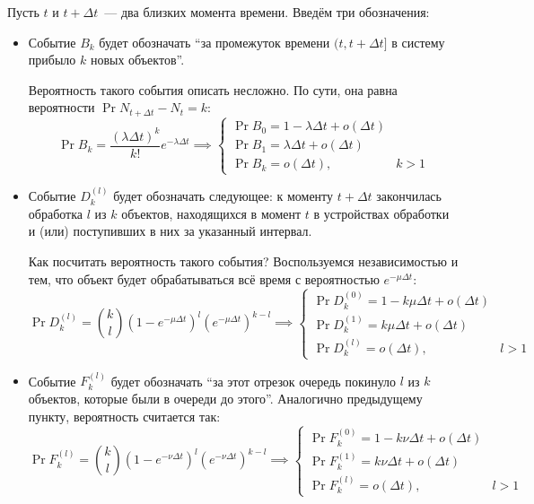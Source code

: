 Пусть \(t\) и \(t + \Delta t\)~--- два близких момента времени. Введём три 
обозначения:
\begin{itemize}
	\item Событие \(B_{k}\) будет обозначать ``за промежуток времени \((t, t + 
	\Delta t]\) в систему прибыло \(k\) новых объектов''. 
	
	Вероятность такого события описать несложно. По сути, она равна вероятности 
	\(\Pr{N_{t + \Delta t} - N_{t} = k}\):
	\[
		\Pr{B_{k}} = \frac{(\lambda\Delta t)^{k}}{k!}e^{-\lambda\Delta t} 
		\implies \begin{cases}
		\Pr{B_{0}} = 1 - \lambda\Delta t + o(\Delta t) \\
		\Pr{B_{1}} = \lambda\Delta t + o(\Delta t) \\
		\Pr{B_{k}} = o(\Delta t), & k > 1
		\end{cases}
	\]
	
	\item Событие \(D_{k}^{(l)}\) будет обозначать следующее: к моменту \(t + 
	\Delta t\) закончилась обработка \(l\) из \(k\) объектов, находящихся в 
	момент \(t\) в устройствах обработки и (или) поступивших в них за указанный 
	интервал.
	
	Как посчитать вероятность такого события? Воспользуемся независимостью и 
	тем, что объект будет обрабатываться всё время с вероятностью 
	\(e^{-\mu\Delta t}\):
	\[
		\Pr{D_{k}^{(l)}} = \binom{k}{l}(1 - e^{-\mu\Delta t})^{l}(e^{-\mu\Delta 
		t})^{k - l} \implies \begin{cases}
		\Pr{D_{k}^{(0)}} = 1 - k\mu\Delta t + o(\Delta t) \\
		\Pr{D_{k}^{(1)}} = k\mu\Delta t + o(\Delta t) \\
		\Pr{D_{k}^{(l)}} = o(\Delta t), & l > 1
		\end{cases}
	\]
	\item Событие \(F_{k}^{(l)}\) будет обозначать ``за этот отрезок очередь 
	покинуло \(l\) из \(k\) объектов, которые были в очереди до этого''. 
	Аналогично предыдущему пункту, вероятность считается так:
	\[
	\Pr{F_{k}^{(l)}} = \binom{k}{l}(1 - e^{-\nu\Delta t})^{l}(e^{-\nu\Delta 
		t})^{k - l} \implies \begin{cases}
	\Pr{F_{k}^{(0)}} = 1 - k\nu\Delta t + o(\Delta t) \\
	\Pr{F_{k}^{(1)}} = k\nu\Delta t + o(\Delta t) \\
	\Pr{F_{k}^{(l)}} = o(\Delta t), & l > 1
	\end{cases}
	\]
\end{itemize}

